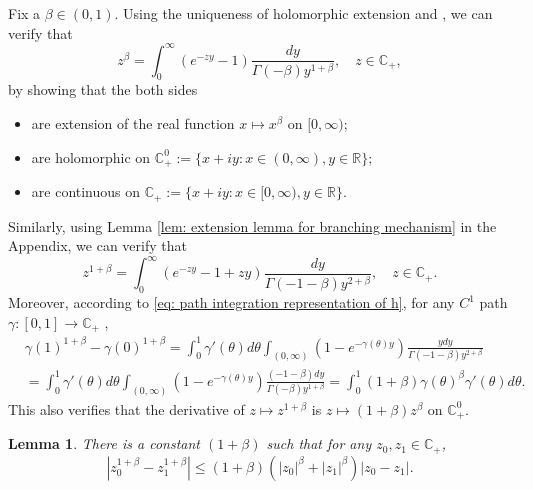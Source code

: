 \documentclass[12pt]{amsart}
\theoremstyle{plain}
\newtheorem{lem}[thm]{Lemma}
\theoremstyle{definition}
\numberwithin{equation}{section}
\begin{document}
    Fix a $\beta \in (0,1)$.
    Using the uniqueness of holomorphic extension and \cite[Theorem 3.2. \& Theorem 3.5.]{SchillingSongVondracek2010Bernstein}, we can verify that
\begin{equation}
    z^{\beta}
	= \int_0^\infty (e^{-zy}-1) \frac{dy}{\Gamma(-\beta)y^{1+\beta}},
    \quad z\in \mathbb C_+,
\end{equation}
	by showing that the both sides
\begin{itemize}
\item
    are extension of the real function $x\mapsto x^{\beta}$ on $[0,\infty)$;
\item
    are holomorphic on $\mathbb C_+^0:= \{x+iy:x\in (0,\infty), y\in \mathbb R\}$;
\item
    are continuous on $\mathbb C_+ :=\{x+iy: x\in [0,\infty), y\in \mathbb R\}$.
\end{itemize}
    Similarly, using Lemma \ref{lem: extension lemma for branching mechanism} in the Appendix, we can verify that
\begin{equation}
\label{eq: stable branching on C+}
    z^{1+\beta}
    = \int_0^\infty (e^{-zy}-1+zy)\frac{dy}{\Gamma(-1-\beta)y^{2+\beta}},
    \quad z\in \mathbb C_+.
\end{equation}
    Moreover, according to \eqref{eq: path integration representation of h}, for any $C^1$ path $\gamma:[0,1]\to \mathbb C_+$ ,
\begin{align}
\label{eq: integration formula for 1+beta-th power of z}
    &\gamma(1)^{1+\beta} - \gamma(0)^{1+\beta}
    = \int_0^1 \gamma'(\theta)d\theta \int_{(0,\infty)}(1-e^{-\gamma(\theta)y})\frac{ydy}{\Gamma(-1-\beta)y^{2+\beta}}
    \\&=\int_0^1 \gamma'(\theta)d\theta \int_{(0,\infty)}(1-e^{-\gamma(\theta)y})\frac{(-1-\beta)dy}{\Gamma(-\beta)y^{1+\beta}}
    = \int_0^1 (1+\beta) \gamma(\theta)^{\beta} \gamma'(\theta)d\theta.
\end{align}
    This also verifies that the derivative of $z\mapsto z^{1+\beta}$ is $z\mapsto (1+\beta)z^{\beta}$ on $\mathbb C^0_+$.
\begin{lem}
\label{lem: Lip of power function}
    There is a constant $(1+\beta)$ such that for any $z_0,z_1 \in \mathbb C_+$,
\begin{equation}
\label{eq: Lip of power function}
    |z_0^{1+\beta} - z_1^{1+\beta}|
    \leq (1+\beta)(|z_0|^{\beta}+|z_1|^{\beta})|z_0 - z_1|.
\end{equation}

\end{lem}
\end{document}
